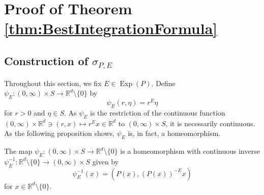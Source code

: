 \documentclass[smallextended]{svjour3}
\theoremstyle{remark}
\newcommand\Exp{\operatorname{Exp}}
\begin{document}








\section{Proof of Theorem \ref{thm:BestIntegrationFormula}}\label{sec:ProofofBest}



\subsection{Construction of $\sigma_{P,E}$}\label{subsec:ConstructionofSigma}
Throughout this section, we fix $E\in\Exp(P)$. Define $\psi_E:(0,\infty)\times S\to\mathbb{R}^d\setminus\{0\}$ by
\begin{equation}\label{eq:Homeomorphism}
\psi_E(r,\eta)=r^E\eta
\end{equation}
for $r>0$ and $\eta\in S$. As $\psi_E$ is the restriction of the continuous function $(0,\infty)\times \mathbb{R}^d\ni (r,x)\mapsto r^E x\in\mathbb{R}^d$ to $(0,\infty)\times S$, it is necessarily continuous. As the following proposition shows, $\psi_E$ is, in fact, a homeomorphism.

\begin{proposition}\label{prop:PsiHomeomorphism}
The map $\psi_E:(0,\infty)\times S\to\mathbb{R}^d\setminus\{0\}$ is a homeomorphism with continuous inverse $\psi_E^{-1}:\mathbb{R}^d\setminus\{0\}\to (0,\infty)\times S$ given by
\begin{equation*}
\psi_E^{-1}(x)=(P(x),(P(x))^{-E}x)
\end{equation*}
for $x\in\mathbb{R}^d\setminus\{0\}$.
\end{proposition}
\end{document}
